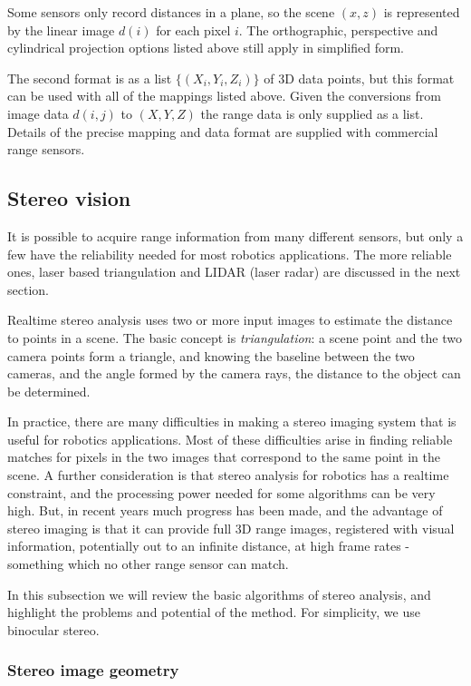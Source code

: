 \documentclass[twocolumn,oneside]{book}
\begin{document}
Some sensors only record distances in a plane, so the scene $(x,z)$ is
represented by the linear image $d(i)$ for each pixel $i$.
The orthographic, perspective and cylindrical projection options
listed above still apply in simplified form.

The second format is as a list $\{(X_i,Y_i,Z_i)\}$ of 3D data points,
but this format can be used with all of the mappings listed above.
Given the conversions from image data $d(i,j)$ to $(X,Y,Z)$ 
the range data is only supplied as a list.
Details of the precise mapping and data format are supplied with
commercial range sensors.

\subsection{Stereo vision}

It is possible to acquire range information from many different sensors,
but only a few have the reliability needed for most robotics applications.
The more reliable ones,  laser based triangulation and LIDAR (laser radar)
are discussed in the next section.

Realtime stereo analysis uses two or more input images to estimate the
distance to points in a scene.  The basic concept is {\em
triangulation}: a scene point and the two camera points form a
triangle, and knowing the baseline between the two cameras, and the
angle formed by the camera rays, the distance to the object can be
determined.

In practice, there are many difficulties in making a stereo imaging
system that is useful for robotics applications.  Most of these
difficulties arise in finding reliable matches for pixels in the two
images that correspond to the same point in the scene.  A further
consideration is that stereo analysis for robotics has a realtime
constraint, and the processing power needed for some algorithms can be
very high.  But, in recent years much progress has been made, and the
advantage of stereo imaging is that it can provide full 3D range
images, registered with visual information, potentially out to an
infinite distance, at high frame rates - something which no other
range sensor can match.

In this subsection we will review the basic algorithms of stereo
analysis, and highlight the problems and potential of the method.
For simplicity, we use binocular stereo.

\subsubsection{Stereo image geometry}
\end{document}
